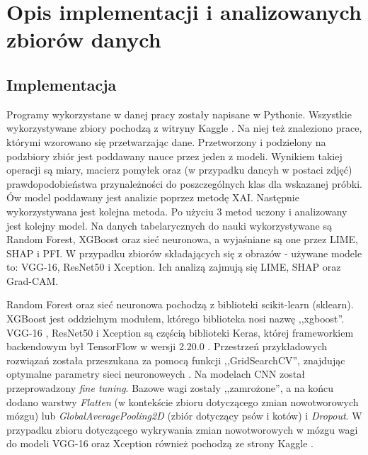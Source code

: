 \section{Opis implementacji i analizowanych zbiorów danych}
\subsection{Implementacja}
Programy wykorzystane w danej pracy zostały napisane w Pythonie. Wszystkie wykorzystywane zbiory pochodzą z witryny Kaggle \cite{kaggle_site}. Na niej też znaleziono prace, którymi wzorowano się przetwarzając dane. Przetworzony i podzielony na podzbiory zbiór jest poddawany nauce przez jeden z modeli. Wynikiem takiej operacji są miary, macierz pomyłek oraz (w przypadku dancyh w postaci zdjęć) prawdopodobieństwa przynależności do poszczególnych klas dla wskazanej próbki. Ów model poddawany jest analizie poprzez metodę XAI. Następnie wykorzystywana jest kolejna metoda. Po użyciu 3 metod uczony i analizowany jest kolejny model. Na danych tabelarycznych do nauki wykorzystywane są Random Forest, XGBoost oraz sieć neuronowa, a wyjaśniane są one przez LIME, SHAP i PFI. W przypadku zbiorów składających się z obrazów - używane modele to: VGG-16, ResNet50 i Xception. Ich analizą zajmują się LIME, SHAP oraz Grad-CAM. 

Random Forest \cite{rfc_documentation} oraz sieć neuronowa \cite{mlpc_documentation} pochodzą z biblioteki scikit-learn (sklearn). XGBoost \cite{xgb_documentation} jest oddzielnym modułem, którego biblioteka nosi nazwę ,,xgboost''. VGG-16 \cite{vgg16_documentation}, ResNet50 \cite{resnet50_documentation} i Xception \cite{xception_documentation} są częścią biblioteki Keras, której frameworkiem backendowym był TensorFlow w wersji 2.20.0 \cite{tensorflow_site}. Przestrzeń przykładowych rozwiązań została przeszukana za pomocą funkcji ,,GridSearchCV'', znajdując optymalne parametry sieci neuronoweych \cite{gridsearchcv_documentation}. Na modelach CNN został przeprowadzony \textit{fine tuning}. Bazowe wagi zostały ,,zamrożone'', a na końcu dodano warstwy \textit{Flatten} (w kontekście zbioru dotyczącego zmian nowotworowych mózgu) lub \textit{GlobalAveragePooling2D} (zbiór dotyczący psów i kotów) i \textit{Dropout}. W przypadku zbioru dotyczącego wykrywania zmian nowotworowych w mózgu wagi do modeli VGG-16 oraz Xception również pochodzą ze strony Kaggle \cite{kaggle_pretrain_models}. 

